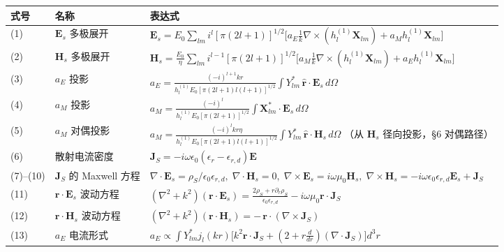 \begin{table}[htbp]
\centering\small
\setlength{\tabcolsep}{4pt}
\begin{tabular}{p{1.6cm}p{3.2cm}p{9.5cm}}
\toprule
\textbf{式号} & \textbf{名称} & \textbf{表达式} \\
\midrule
(1) & $\mathbf{E}_s$ 多极展开 & $\displaystyle \mathbf{E}_s = E_0\sum_{lm} i^l[\pi(2l+1)]^{1/2}\bigl[
  a_E\frac{1}{k}\nabla\times(h_l^{(1)}\mathbf{X}_{lm}) + a_M h_l^{(1)}\mathbf{X}_{lm}\bigr]$ \\[1em]
(2) & $\mathbf{H}_s$ 多极展开 & $\displaystyle \mathbf{H}_s = \frac{E_0}{\eta}\sum_{lm} i^{l-1}[\pi(2l+1)]^{1/2}\bigl[
  a_M\frac{1}{k}\nabla\times(h_l^{(1)}\mathbf{X}_{lm}) + a_E h_l^{(1)}\mathbf{X}_{lm}\bigr]$ \\[1em]
(3) & $a_E$ 投影 & $\displaystyle a_E = \frac{(-i)^{l+1}kr}{h_l^{(1)}E_0[\pi(2l+1)l(l+1)]^{1/2}}
  \int Y_{lm}^*\,\hat{\mathbf{r}}\cdot\mathbf{E}_s\,d\Omega$ \\[1em]
(4) & $a_M$ 投影 & $\displaystyle a_M = \frac{(-i)^l}{h_l^{(1)}E_0[\pi(2l+1)]^{1/2}}
  \int \mathbf{X}_{lm}^*\cdot\mathbf{E}_s\,d\Omega$ \\[1em]
(5) & $a_M$ 对偶投影 & $\displaystyle a_M = \frac{(-i)^l kr\eta}{h_l^{(1)}E_0[\pi(2l+1)l(l+1)]^{1/2}}
  \int Y_{lm}^*\,\hat{\mathbf{r}}\cdot\mathbf{H}_s\,d\Omega$ \quad（从 $\mathbf{H}_s$ 径向投影，\S6 对偶路径）\\[1em]
(6) & 散射电流密度 & $\displaystyle \mathbf{J}_S = -i\omega\epsilon_0(\epsilon_r-\epsilon_{r,d})\mathbf{E}$ \\[1em]
(7)--(10) & $\mathbf{J}_S$ 的 Maxwell 方程 & $\displaystyle
  \nabla\cdot\mathbf{E}_s=\rho_S/\epsilon_0\epsilon_{r,d},\;
  \nabla\cdot\mathbf{H}_s=0,\;
  \nabla\times\mathbf{E}_s=i\omega\mu_0\mathbf{H}_s,\;
  \nabla\times\mathbf{H}_s=-i\omega\epsilon_0\epsilon_{r,d}\mathbf{E}_s+\mathbf{J}_S$ \\[1em]
(11) & $\mathbf{r}\cdot\mathbf{E}_s$ 波动方程 & $\displaystyle (\nabla^2+k^2)(\mathbf{r}\cdot\mathbf{E}_s) = \frac{2\rho_S+r\partial_r\rho_S}{\epsilon_0\epsilon_{r,d}} - i\omega\mu_0\mathbf{r}\cdot\mathbf{J}_S$ \\[1em]
(12) & $\mathbf{r}\cdot\mathbf{H}_s$ 波动方程 & $\displaystyle (\nabla^2+k^2)(\mathbf{r}\cdot\mathbf{H}_s) = -\,\mathbf{r}\cdot(\nabla\times\mathbf{J}_S)$ \\[1em]
(13) & $a_E$ 电流形式 & $\displaystyle a_E \propto \int Y_{lm}^*j_l(kr)\bigl[k^2\mathbf{r}\cdot\mathbf{J}_S + \left(2+r\frac{d}{dr}\right)(\nabla\cdot\mathbf{J}_S)\bigr]d^3r$ \\[1em]

\end{tabular}
\end{table}
